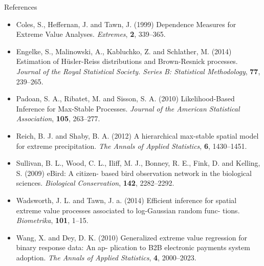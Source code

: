 \documentclass{beamer}
\begin{document}
\begin{frame}[allowframebreaks]{References}
  \footnotesize
  \begin{itemize} \setlength{\itemsep}{1em}
    \item Coles, S., Heffernan, J. and Tawn, J. (1999) Dependence Measures for Extreme Value Analyses. \emph{Extremes}, \textbf{2}, 339--365.
    \item Engelke, S., Malinowski, A., Kabluchko, Z. and Schlather, M. (2014) Estimation of H\"{u}sler-Reiss distributions and Brown-Resnick processes. \emph{Journal of the Royal Statistical Society. Series B: Statistical Methodology}, \textbf{77}, 239--265.
    \item Padoan, S. A., Ribatet, M. and Sisson, S. A. (2010) Likelihood-Based Inference for Max-Stable Processes. \emph{Journal of the American Statistical Association}, \textbf{105}, 263--277.
    \item Reich, B. J. and Shaby, B. A. (2012) A hierarchical max-stable spatial model for extreme precipitation. \emph{The Annals of Applied Statistics}, \textbf{6}, 1430--1451.
    \item Sullivan, B. L., Wood, C. L., Iliff, M. J., Bonney, R. E., Fink, D. and Kelling, S. (2009) eBird: A citizen- based bird observation network in the biological sciences. \emph{Biological Conservation}, \textbf{142}, 2282--2292.
    \item Wadsworth, J. L. and Tawn, J. a. (2014) Efficient inference for spatial extreme value processes associated to log-Gaussian random func- tions. \emph{Biometrika}, \textbf{101}, 1--15.
    \item Wang, X. and Dey, D. K. (2010) Generalized extreme value regression for binary response data: An ap- plication to B2B electronic payments system adoption. \emph{The Annals of Applied Statistics}, \textbf{4}, 2000--2023.
  \end{itemize}
\end{frame}
\end{document}
